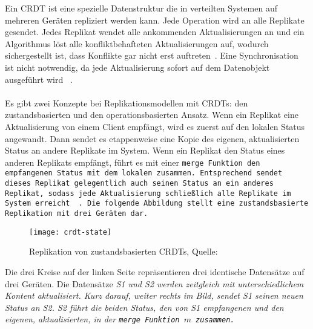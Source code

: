%
%
Ein \gls{CRDT} ist eine spezielle Datenstruktur die in verteilten Systemen auf mehreren Geräten repliziert werden kann. Jede Operation wird an alle Replikate gesendet. Jedes Replikat wendet alle ankommenden Aktualisierungen an und ein Algorithmus löst alle konfliktbehafteten Aktualisierungen auf, wodurch sichergestellt ist, dass Konflikte gar nicht erst auftreten~\cite{crdt_shapiro}. Eine Synchronisation ist nicht notwendig, da jede Aktualisierung sofort auf dem Datenobjekt ausgeführt wird ~\cite{crdt_shapiro2}.\\\\
%
Es gibt zwei Konzepte bei Replikationsmodellen mit \glspl{CRDT}: den zustandsbasierten und den operationsbasierten Ansatz.
%
Wenn ein Replikat eine Aktualisierung von einem Client empfängt, wird es zuerst auf den lokalen Status angewandt.
Dann sendet es etappenweise eine Kopie des eigenen, aktualisierten Status an andere Replikate im System.
Wenn ein Replikat den Status eines anderen Replikats empfängt, führt es mit einer \tt{merge} Funktion den empfangenen Status mit dem lokalen zusammen.
Entsprechend sendet dieses Replikat gelegentlich auch seinen Status an ein anderes Replikat, sodass jede Aktualisierung schließlich alle Replikate im System erreicht ~\cite{crdt_shapiro2}.
Die folgende Abbildung stellt eine zustandsbasierte Replikation mit drei Geräten dar.
%
\begin{figure}[H]
  \centering
  \texttt{[image: crdt-state]}
  \grayRule
  \caption[Replikation von zustandsbasierten \glspl{CRDT}]{Replikation von zustandsbasierten \glspl{CRDT}, Quelle: ~\cite{crdt_shapiro2}}
  \label{fig:crdt-state}
\end{figure}
%
Die drei Kreise auf der linken Seite repräsentieren drei identische Datensätze auf drei Geräten. Die Datensätze \it{S1} und \it{S2} werden zeitgleich mit unterschiedlichem Kontent aktualisiert.
Kurz darauf, weiter rechts im Bild, sendet \it{S1} seinen neuen Status an \it{S2}.
\it{S2} führt die beiden Status, den von \it{S1} empfangenen und den eigenen, aktualisierten, in der \tt{merge} Funktion $m$ zusammen.
